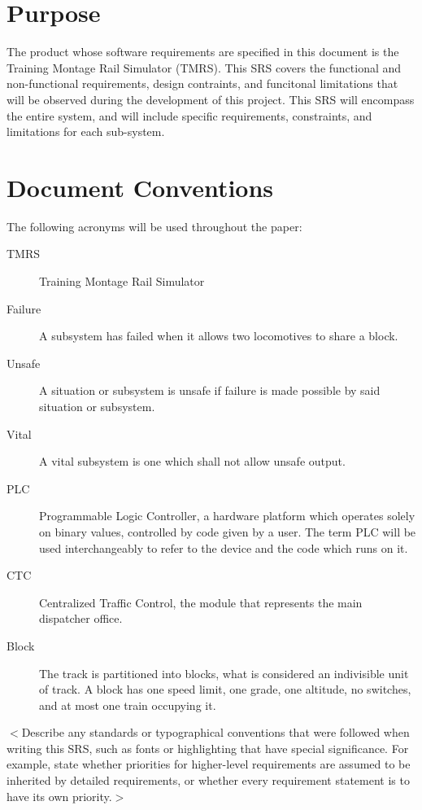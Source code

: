 \documentclass{scrreprt}
\begin{document}
\section{Purpose}
The product whose software requirements are specified in this document is the
Training Montage Rail Simulator (TMRS). This SRS covers the functional and 
non-functional requirements, design contraints, and funcitonal limitations that
will be observed during the development of this project. This SRS will encompass
the entire system, and will include specific requirements, constraints, and 
limitations for each sub-system.

\section{Document Conventions}
The following acronyms will be used throughout the paper:

\begin{description}
  \item[TMRS] Training Montage Rail Simulator
  \item[Failure] A subsystem has failed when it allows two locomotives to share a block.
  \item[Unsafe] A situation or subsystem is unsafe if failure is made possible by said situation or subsystem.
  \item[Vital] A vital subsystem is one which shall not allow unsafe output.
  \item[PLC] Programmable Logic Controller, a hardware platform which operates solely on binary values, controlled by code given by a user. The term PLC will be used interchangeably to refer to the device and the code which runs on it.
  \item[CTC] Centralized Traffic Control, the module that represents the main dispatcher office.
  \item[Block] The track is partitioned into blocks, what is considered an indivisible unit of track. A block has one speed limit, one grade, one altitude, no switches, and at most one train occupying it.
\end{description}

$<$Describe any standards or typographical conventions that were followed when 
writing this SRS, such as fonts or highlighting that have special significance.  
For example, state whether priorities  for higher-level requirements are assumed 
to be inherited by detailed requirements, or whether every requirement statement 
is to have its own priority.$>$
\end{document}
